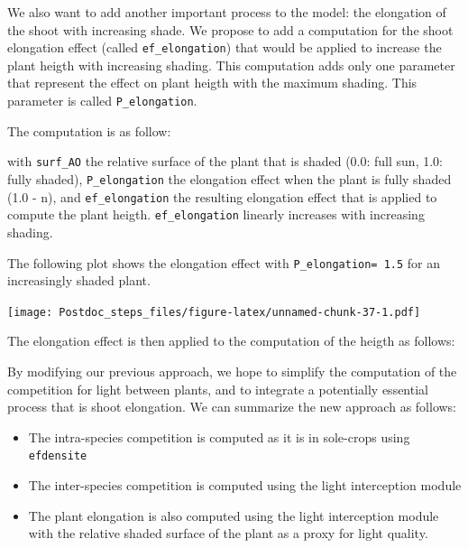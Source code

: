 \documentclass[
]{book}
\begin{document}
We also want to add another important process to the model: the elongation of the shoot with increasing shade. We propose to add a computation for the shoot elongation effect (called \texttt{ef\_elongation}) that would be applied to increase the plant heigth with increasing shading. This computation adds only one parameter that represent the effect on plant heigth with the maximum shading. This parameter is called \texttt{P\_elongation}.

The computation is as follow:

with \texttt{surf\_AO} the relative surface of the plant that is shaded (0.0: full sun, 1.0: fully shaded), \texttt{P\_elongation} the elongation effect when the plant is fully shaded (1.0 - n), and \texttt{ef\_elongation} the resulting elongation effect that is applied to compute the plant heigth. \texttt{ef\_elongation} linearly increases with increasing shading.

The following plot shows the elongation effect with \texttt{P\_elongation=\ 1.5} for an increasingly shaded plant.

\texttt{[image: Postdoc\_steps\_files/figure-latex/unnamed-chunk-37-1.pdf]}

The elongation effect is then applied to the computation of the heigth as follows:

By modifying our previous approach, we hope to simplify the computation of the competition for light between plants, and to integrate a potentially essential process that is shoot elongation. We can summarize the new approach as follows:

\begin{itemize}
\item
  The intra-species competition is computed as it is in sole-crops using \texttt{efdensite}
\item
  The inter-species competition is computed using the light interception module
\item
  The plant elongation is also computed using the light interception module with the relative shaded surface of the plant as a proxy for light quality.
\end{itemize}

  
\end{document}
